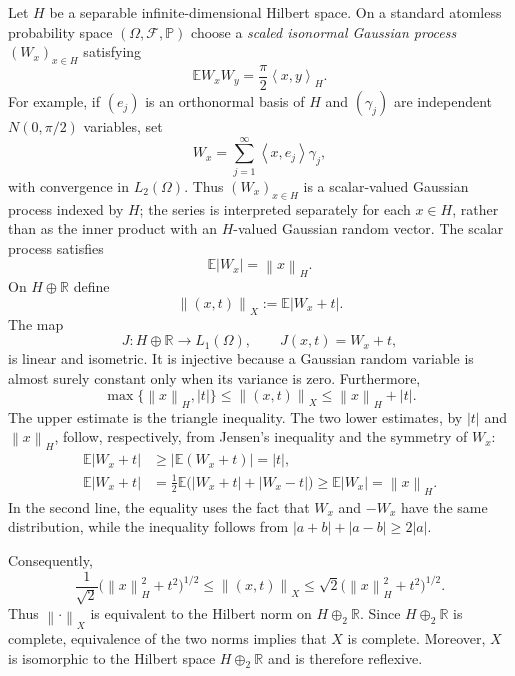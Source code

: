 \documentclass[11pt]{article}
\theoremstyle{definition}
\theoremstyle{remark}
\newcommand{\R}{\mathbb R}
\newcommand{\E}{\mathbb E}
\newcommand{\abs}[1]{\left|#1\right|}
\newcommand{\norm}[1]{\left\|#1\right\|}
\newcommand{\ip}[2]{\left\langle #1,#2\right\rangle}
\begin{document}
Let $H$ be a separable infinite-dimensional Hilbert space.  On a standard %
atomless probability space 
$(\Omega,\mathcal F,\mathbb P)$ choose a
\emph{scaled isonormal Gaussian process} $(W_x)_{x\in H}$ satisfying
\begin{equation}\label{eq:isonormal-covariance}
 \E W_xW_y=\frac\pi2\ip{x}{y}_H.
\end{equation}
For example, if $(e_j)$ is an orthonormal basis of $H$ and
$(\gamma_j)$ are independent $N(0,\pi/2)$ variables, set
\[
 W_x=\sum_{j=1}^\infty\ip{x}{e_j}\gamma_j,
\]
with convergence in $L_2(\Omega)$.   Thus
$(W_x)_{x\in H}$ is a scalar-valued Gaussian process indexed by $H$;
the series is interpreted separately for each $x\in H$, rather than as
the inner product with an $H$-valued Gaussian random vector.  The
scalar process satisfies
\begin{equation}\label{eq:W-absolute-moment}
 \E\abs{W_x}=\norm{x}_H.
\end{equation}
On $H\oplus\R$ define
\begin{equation}\label{eq:X-norm}
\norm{(x,t)}_X:=\E\abs{W_x+t}.
\end{equation}
The map
\begin{equation}\label{eq:J-embedding}
 J:H\oplus\R\longrightarrow L_1(\Omega),
 \qquad J(x,t)=W_x+t,
\end{equation}
is linear and isometric.  It is injective because a Gaussian random
variable is almost surely constant only when its variance is zero.
Furthermore,
\begin{equation}\label{eq:X-Hilbert-equivalence}
 \max\{\norm{x}_H,\abs t\}
 \leq\norm{(x,t)}_X
 \leq\norm{x}_H+\abs t.
\end{equation}
The upper estimate is the triangle inequality.  The two
lower estimates, by $\abs t$ and $\norm{x}_H$, follow, respectively,
from Jensen's inequality and the symmetry of $W_x$:
\begin{align*}
 \E\abs{W_x+t}
 &\geq \abs{\E(W_x+t)}=\abs t,\\
 \E\abs{W_x+t}
 &=\frac12\E\bigl(\abs{W_x+t}+\abs{W_x-t}\bigr)
 \geq\E\abs{W_x}=\norm{x}_H.
\end{align*}
In the second line, the equality uses the fact that $W_x$ and $-W_x$
have the same distribution, while the inequality follows from
$\abs{a+b}+\abs{a-b}\geq2\abs a$.

Consequently,
\[
 \frac1{\sqrt2}
 \bigl(\norm{x}_H^2+t^2\bigr)^{1/2}
 \leq \norm{(x,t)}_X
 \leq
 \sqrt2\bigl(\norm{x}_H^2+t^2\bigr)^{1/2}.
\]
Thus $\norm{\cdot}_X$ is equivalent to the Hilbert norm on
$H\oplus_2\R$.  Since $H\oplus_2\R$ is complete, equivalence of the
two norms implies that $X$ is complete.  Moreover, $X$ is isomorphic
to the Hilbert space $H\oplus_2\R$ and is therefore reflexive.
\end{document}
